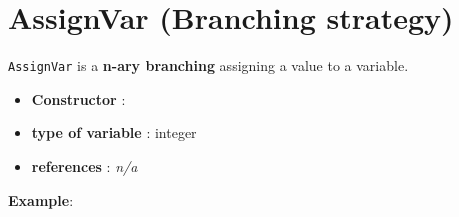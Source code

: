 \section{AssignVar (Branching strategy)}\label{assignvar:assignvarbranchstrat}\hypertarget{assignvar:assignvarbranchstrat}{}
\begin{notedef}
  \texttt{AssignVar} is a \textbf{n-ary branching} assigning a value to a variable. 
\end{notedef}

\begin{itemize}
	\item \textbf{Constructor} :
	\item \textbf{type of variable} : integer
	\item \textbf{references} : \emph{n/a}
\end{itemize}

\textbf{Example}:
%

